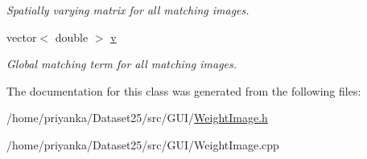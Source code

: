 \begin{DoxyCompactItemize}
\begin{DoxyCompactList}\small\item\em \-Spatially varying matrix for all matching images. \end{DoxyCompactList}\item 
\hypertarget{classWeightImage_ac7a597c38f8209278d2e2423b3311dc8}{vector$<$ double $>$ \hyperlink{classWeightImage_ac7a597c38f8209278d2e2423b3311dc8}{v}}\label{classWeightImage_ac7a597c38f8209278d2e2423b3311dc8}

\begin{DoxyCompactList}\small\item\em \-Global matching term for all matching images. \end{DoxyCompactList}\end{DoxyCompactItemize}


\-The documentation for this class was generated from the following files\-:\begin{DoxyCompactItemize}
\item 
/home/priyanka/\-Dataset25/src/\-G\-U\-I/\hyperlink{WeightImage_8h}{\-Weight\-Image.\-h}\item 
/home/priyanka/\-Dataset25/src/\-G\-U\-I/\-Weight\-Image.\-cpp\end{DoxyCompactItemize}

